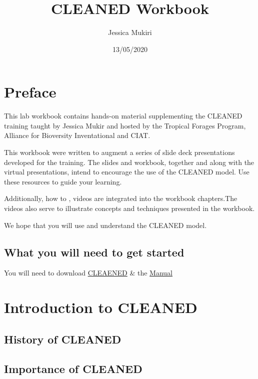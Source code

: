 \documentclass[
]{book}
\title{CLEANED Workbook}
\author{Jessica Mukiri}
\date{13/05/2020}
\begin{document}
\maketitle

{
\setcounter{tocdepth}{1}
\tableofcontents
}
\hypertarget{preface}{%
\chapter*{Preface}\label{preface}}

This lab workbook contains hands-on material supplementing the CLEANED training taught by Jessica Mukir and hosted by the Tropical Forages Program, Alliance for Bioversity Inventational and CIAT.

This workbook were written to augment a series of slide deck presentations developed for the training. The slides and workbook, together and along with the virtual presentations, intend to encourage the use of the CLEANED model. Use these resources to guide your learning.

Additionally, how to , videos are integrated into the workbook chapters.The videos also serve to illustrate concepts and techniques presented in the workbook.

We hope that you will use and understand the CLEANED model.

\hypertarget{what-you-will-need-to-get-started}{%
\section{What you will need to get started}\label{what-you-will-need-to-get-started}}

You will need to download \href{https://dataverse.harvard.edu/dataset.xhtml?persistentId=doi:10.7910/DVN/G0G8IY}{CLEAENED} \& the \href{https://hdl.handle.net/10568/107238}{Manual}

\hypertarget{intro}{%
\chapter{Introduction to CLEANED}\label{intro}}

\hypertarget{history-of-cleaned}{%
\section{History of CLEANED}\label{history-of-cleaned}}

\hypertarget{importance-of-cleaned}{%
\section{Importance of CLEANED}\label{importance-of-cleaned}}
\end{document}
